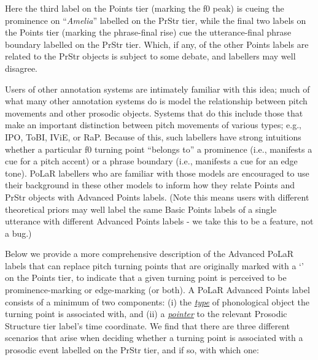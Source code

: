 \documentclass[11pt, twoside]{memoir}
\def\textlabel#1{{\relsize{-.5}\fontspec[Mapping=tex-text]{Roboto Mono}{#1}}}
\def\langtext#1{\textit{#1}}
\begin{document}
Here the third label on the Points tier (marking the f0 peak) is cueing the prominence on “\langtext{Amelia}” labelled on the PrStr tier, while the final two labels on the Points tier (marking the phrase-final rise) cue the utterance-final phrase boundary labelled on the PrStr tier. Which, if any, of the other Points labels are related to the PrStr objects is subject to some debate, and labellers may well disagree.

Users of other annotation systems are intimately familiar with this idea; much of what many other annotation systems do is model the relationship between pitch movements and other prosodic objects. Systems that do this include those that make an important distinction between pitch movements of various types; e.g., IPO, ToBI, IViE, or RaP. Because of this, such labellers have strong intuitions whether a particular f0 turning point “belongs to” a prominence (i.e., manifests a cue for a pitch accent) or a phrase boundary (i.e., manifests a cue for an edge tone). PoLaR labellers who are familiar with those models are encouraged to use their background in these other models to inform how they relate Points and PrStr objects with Advanced Points labels. (Note this means users with different theoretical priors may well label the same Basic Points labels of a single utterance with different Advanced Points labels - we take this to be a feature, not a bug.)

Below we provide a more comprehensive description of the Advanced PoLaR labels that can replace pitch turning points that are originally marked with a ‘\textlabel{0}’ on the Points tier, to indicate that a given turning point is perceived to be prominence-marking or edge-marking (or both). A PoLaR Advanced Points label consists of a minimum of two components: (i) the \textit{\uline{type}} of phonological object the turning point is associated with, and (ii) a \textit{\uline{pointer}} to the relevant Prosodic Structure tier label’s time coordinate. We find that there are three different scenarios that arise when deciding whether a turning point is associated with a prosodic event labelled on the PrStr tier, and if so, with which one:
\end{document}
